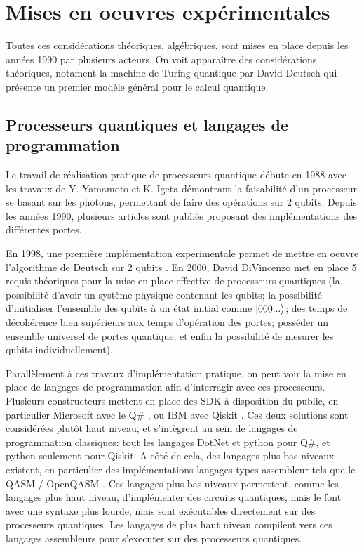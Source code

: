 \chapter{Mises en oeuvres expérimentales}

Toutes ces considérations théoriques, algébriques, sont mises en place depuis les années 1990 par plusieurs acteurs. On voit apparaître des considérations théoriques, notament la machine de Turing quantique par David Deutsch \cite{Deutsch85} qui présente un premier modèle général pour le calcul quantique. 

\section{Processeurs quantiques et langages de programmation}
Le travail de réalisation pratique de processeurs quantique débute en 1988 avec les travaux de Y. Yamamoto et K. Igeta \cite{Igeta:88} démontrant la faisabilité d'un processeur se basant sur les photons, permettant de faire des opérations sur 2 qubits. Depuis les années 1990, plusieurs articles sont publiés proposant des implémentations des différentes portes. 

En 1998, une première implémentation experimentale permet de mettre en oeuvre l'algorithme de Deutsch sur 2 qubits \cite{Chuang1998ExperimentalIO}. En 2000, David DiVincenzo met en place 5 requis théoriques pour la mise en place effective de processeurs quantiques \cite{DiVincenzo_2000} (la possibilité d'avoir un système physique contenant les qubits; la possibilité d'initialiser l'ensemble des qubits à un état initial comme $\ket{000...}$; des temps de décohérence bien supérieurs aux temps d'opération des portes; posséder un ensemble universel de portes quantique; et enfin la possibilité de mesurer les qubits individuellement).

Parallèlement à ces travaux d'implémentation pratique, on peut voir la mise en place de langages de programmation afin d'interragir avec ces processeurs. Plusieurs constructeurs mettent en place des SDK à disposition du public, en particulier Microsoft avec le Q\# \cite{MicrosoftQuantumDoc}, ou IBM avec Qiskit \cite{Qiskit}. Ces deux solutions sont considérées plutôt haut niveau, et s'intègrent au sein de langages de programmation classiques: tout les langages DotNet et python pour Q\#, et python seulement pour Qiskit. A côté de cela, des langages plus bas niveaux existent, en particulier des implémentations langages types assembleur tels que le QASM / OpenQASM \cite{cross2017open}. Ces langages plus bas niveaux permettent, comme les langages plus haut niveau, d'implémenter des circuits quantiques, mais le font avec une syntaxe plus lourde, mais sont exécutables directement sur des processeurs quantiques. Les langages de plus haut niveau compilent vers ces langages assembleurs pour s'executer sur des processeurs quantiques.

